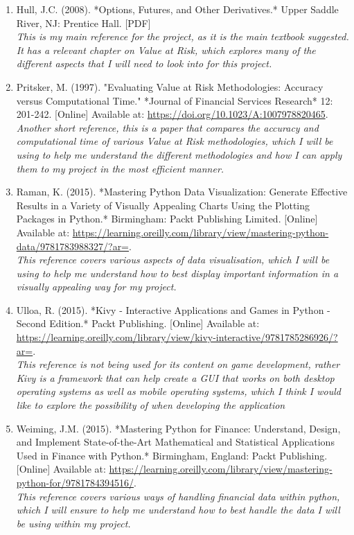 \documentclass{article}
\begin{document}
\begin{small}
\begin{enumerate}
  \item \label{ref6} Hull, J.C. (2008). *Options, Futures, and Other Derivatives.* Upper Saddle River, NJ: Prentice Hall. [PDF]
  \\\textit{This is my main reference for the project, as it is the main textbook suggested. It has a relevant chapter on Value at Risk, which explores many of the different aspects that I will need to look into for this project.}

  \item \label{ref7} Pritsker, M. (1997). "Evaluating Value at Risk Methodologies: Accuracy versus Computational Time." *Journal of Financial Services Research* 12: 201-242. [Online] Available at: \url{https://doi.org/10.1023/A:1007978820465}.
  \\\textit{Another short reference, this is a paper that compares the accuracy and computational time of various Value at Risk methodologies, which I will be using to help me understand the different methodologies and how I can apply them to my project in the most efficient manner. }

  \item \label{ref8} Raman, K. (2015). *Mastering Python Data Visualization: Generate Effective Results in a Variety of Visually Appealing Charts Using the Plotting Packages in Python.* Birmingham: Packt Publishing Limited. [Online] Available at: \url{https://learning.oreilly.com/library/view/mastering-python-data/9781783988327/?ar=}.
  \\\textit{This reference covers various aspects of data visualisation, which I will be using to help me understand how to best display important information in a visually appealing way for my project.}

  \item \label{ref9} Ulloa, R. (2015). *Kivy - Interactive Applications and Games in Python - Second Edition.* Packt Publishing. [Online] Available at: \url{https://learning.oreilly.com/library/view/kivy-interactive/9781785286926/?ar=}.
  \\\textit{This reference is not being used for its content on game development, rather Kivy is a framework that can help create a GUI that works on both desktop operating systems as well as mobile operating systems, which I think I would like to explore the possibility of when developing the application}

  \item \label{ref10} Weiming, J.M. (2015). *Mastering Python for Finance: Understand, Design, and Implement State-of-the-Art Mathematical and Statistical Applications Used in Finance with Python.* Birmingham, England: Packt Publishing. [Online] Available at: \url{https://learning.oreilly.com/library/view/mastering-python-for/9781784394516/}.
  \\\textit{This reference covers various ways of handling financial data within python, which I will ensure to help me understand how to best handle the data I will be using within my project.}
\end{enumerate}
\end{small}
\end{document}

